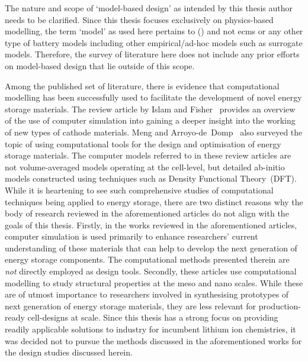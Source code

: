 The nature and  scope of `model-based design' as intended  by this thesis author
needs to  be clarified. Since  this thesis focuses exclusively  on physics-based
modelling,  the  term  `model'  as  used  here  pertains  to  
() and  not \glspl{ecm} or  any other type of  battery models
including other empirical/ad-hoc models such as surrogate models. Therefore, the
survey of  literature here  does not  include any  prior efforts  on model-based
design that lie outside of this scope.

Among  the published  set of  literature, there  is evidence  that computational
modelling  has  been   successfully  used  to  facilitate   the  development  of
novel   energy   storage   materials.   The  review   article   by   Islam   and
Fisher~\cite{Islam2014} provides an  overview of the use  of computer simulation
into  gaining  a  deeper insight  into  the  working  of  new types  of  cathode
materials. Meng  and Arroyo-de~Domp~\cite{Meng2009}  also surveyed the  topic of
using  computational tools  for the  design and  optimisation of  energy storage
materials. The  computer models  referred to  in these  review articles  are not
volume-averaged  models  operating at  the  cell-level,  but detailed  ab-initio
models  constructed using  techniques such  as Density  Functional Theory~(DFT).
While  it is  heartening  to  see such  comprehensive  studies of  computational
techniques being applied  to energy storage, there are two  distinct reasons why
the body of  research reviewed in the aforementioned articles  do not align with
the goals of  this thesis. Firstly, in the works  reviewed in the aforementioned
articles, computer simulation is used  primarily to enhance researchers' current
understanding of these materials that can help to develop the next generation of
energy  storage  components. The  computational  methods  presented therein  are
\emph{not}  directly employed  as  design tools.  Secondly,  these articles  use
computational  modelling to  study structural  properties at  the meso  and nano
scales.  While  these  are  of  utmost importance  to  researchers  involved  in
synthesising prototypes of next generation of energy storage materials, they are
less relevant for production-ready cell-designs  at scale. Since this thesis has
a  strong  focus on  providing  readily  applicable  solutions to  industry  for
incumbent lithium  ion chemistries,  it was  decided not  to pursue  the methods
discussed in the aforementioned works for the design studies discussed herein.

